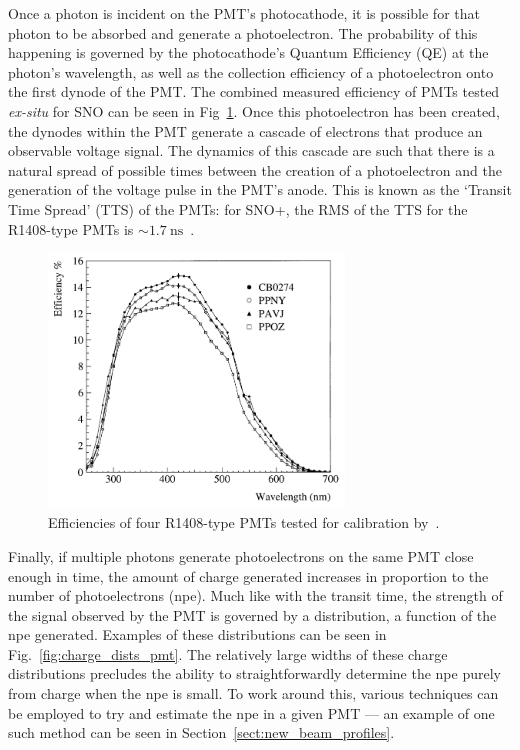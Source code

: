 Once a photon is incident on the PMT's photocathode, it is possible for that photon to be absorbed and generate a photoelectron. The probability of this happening is governed by the photocathode's Quantum Efficiency (QE) at the photon's wavelength, as well as the collection efficiency of a photoelectron onto the first dynode of the PMT. The combined measured efficiency of PMTs tested \textit{ex-situ} for SNO can be seen in Fig~\ref{fig:qe_pmts}. Once this photoelectron has been created, the dynodes within the PMT generate a cascade of electrons that produce an observable voltage signal. The dynamics of this cascade are such that there is a natural spread of possible times between the creation of a photoelectron and the generation of the voltage pulse in the PMT's anode. This is known as the `Transit Time Spread' (TTS) of the PMTs: for SNO+, the RMS of the TTS for the R1408-type PMTs is $\sim\SI{1.7}{\ns}$~\cite{BOGER2000172}. %

\begin{figure}
    \centering
    \includegraphics[width=0.7\textwidth]{2_Detector/Figs/efficiencies_PMTs_biller1999.png}
    \caption[Efficiencies of the R1408-type PMTs used as standard within SNO+]
    {Efficiencies of four R1408-type PMTs tested for calibration by~\cite{billerMeasurementsPhotomultiplierSingle1999}. %
    }
    \label{fig:qe_pmts}
\end{figure}

Finally, if multiple photons generate photoelectrons on the same PMT close enough in time, the amount of charge generated increases in proportion to the number of photoelectrons (npe). Much like with the transit time, the strength of the signal observed by the PMT is governed by a distribution, a function of the npe generated. Examples of these distributions can be seen in Fig.~\ref{fig:charge_dists_pmt}. %
The relatively large widths of these charge distributions precludes the ability to straightforwardly determine the npe purely from charge when the npe is small. To work around this, various techniques can be employed to try and estimate the npe in a given PMT --- an example of one such method can be seen in Section~\ref{sect:new_beam_profiles}.

